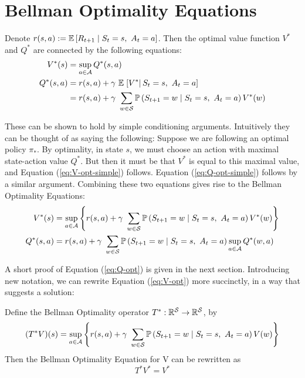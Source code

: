 \section{Bellman Optimality Equations}\label{sec4}
Denote $r(s,a) := \E \left[ R_{t+1} \mid S_t = s,\ A_t = a \right]$. Then the optimal value function $V^*$ and $Q^*$ are connected by the following equations: 
\begin{align}
V^* (s) &= \sup\limits_{a \in \A} Q^* (s, a) \label{eq:V-opt-simple} \\
Q^* (s, a) &= r(s,a) + \gamma\ \E\left.\left[ V^* \right| S_t=s,\ A_t=a \right] \label{eq:Q-opt-simple} \\
&=  r(s,a) + \gamma\ \sum\limits_{w \in \S} \P \left( S_{t+1}=w \mid S_t = s,\ A_t = a \right) V^*(w)\\
\end{align}

These can be shown to hold by simple conditioning arguments. Intuitively they can be thought of as saying the following: Suppose we are following an optimal policy $\pi_*$. By optimality, in state $s$, we must choose an action with maximal state-action value $Q^*$. But then it must be that $V^*$ is equal to this maximal value, and Equation (\ref{eq:V-opt-simple}) follows. Equation (\ref{eq:Q-opt-simple}) follows by a similar argument. Combining these two equations gives rise to the Bellman Optimality Equations: 
\begin{align}
V^* (s) &= \sup\limits_{a \in \A} \left\lbrace  r(s,a) + \gamma\ \sum\limits_{w \in \S} \P \left( S_{t+1}=w \mid S_t = s,\ A_t = a \right) V^*(w) \right\rbrace \label{eq:V-opt} \\
Q^* (s, a) &=  r(s,a) + \gamma\ \sum\limits_{w \in \S} \P \left( S_{t+1}=w \mid S_t = s,\ A_t = a \right) \sup\limits_{a \in \A} Q^* (w, a) \label{eq:Q-opt}
\end{align}

A short proof of Equation (\ref{eq:Q-opt}) is given in the next section. Introducing new notation, we can rewrite Equation (\ref{eq:V-opt}) more succinctly, in a way that suggests a solution:

\begin{definition}
Define the Bellman Optimality operator $T^*: \mathbb{R}^\S \rightarrow \mathbb{R}^\S $, by
\begin{align}
(T^*V)(s) = \sup\limits_{a \in \A} \left\lbrace  r(s,a) + \gamma\ \sum\limits_{w \in \S} \P \left( S_{t+1}=w \mid S_t = s,\ A_t = a \right) V(w) \right\rbrace
\end{align}
Then the Bellman Optimality Equation for V can be rewritten as 
\[
T^*V^* = V^*
\]
\end{definition}

